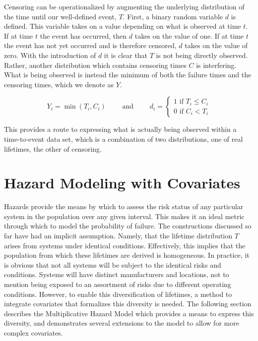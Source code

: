 Censoring can be operationalized by augmenting the underlying distribution of the time until our well-defined event, $T$. First, a binary random variable $d$ is defined. This variable takes on a value depending on what is observed at time $t$. If at time $t$ the event has occurred, then $d$ takes on the value of one. If at time $t$ the event has not yet occurred and is therefore censored, $d$ takes on the value of zero. With the introduction of $d$ it is clear that $T$ is not being directly observed. Rather, another distribution which contains censoring times $C$ is interfering. What is being observed is instead the minimum of both the failure times and the censoring times, which we denote as $Y$.

$$  Y_i = \min(T_i,C_i) \qquad \text{ and } \qquad d_i = \left\{\begin{matrix} 1 \text{ if } T_i \le C_i\\ 0 \text{ if } C_i < T_i \end{matrix}\right. $$

This provides a route to expressing what is actually being observed within a time-to-event data set, which is a combination of two distributions, one of real lifetimes, the other of censoring. 



\section*{Hazard Modeling with Covariates}

Hazards provide the means by which to assess the risk status of any particular system in the population over any given interval. This makes it an ideal metric through which to model the probability of failure. The constructions discussed so far have had an implicit assumption. Namely, that the lifetime distribution $T$ arises from systems under identical conditions. Effectively, this implies that the population from which these lifetimes are derived is homogeneous. In practice, it is obvious that not all systems will be subject to the identical risks and conditions. Systems will have distinct manufacturers and locations, not to mention being exposed to an assortment of risks due to different operating conditions. However, to enable this diversification of lifetimes, a method to integrate covariates that formalizes this diversity is needed. The following section describes the Multiplicative Hazard Model which provides a means to express this diversity, and demonstrates several extensions to the model to allow for more complex covariates.


